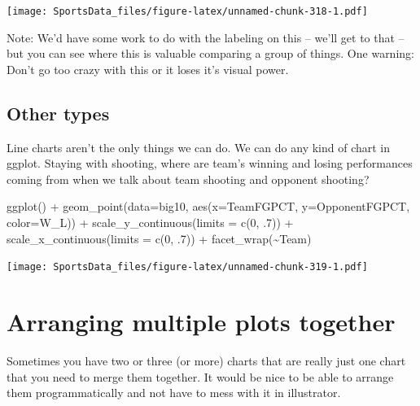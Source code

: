 \documentclass[
]{book}
\newenvironment{Shaded}{\begin{snugshade}}{\end{snugshade}}
\newcommand{\AttributeTok}[1]{\textcolor[rgb]{0.77,0.63,0.00}{#1}}
\newcommand{\DecValTok}[1]{\textcolor[rgb]{0.00,0.00,0.81}{#1}}
\newcommand{\FunctionTok}[1]{\textcolor[rgb]{0.00,0.00,0.00}{#1}}
\newcommand{\NormalTok}[1]{#1}
\newcommand{\SpecialCharTok}[1]{\textcolor[rgb]{0.00,0.00,0.00}{#1}}
\begin{document}
\texttt{[image: SportsData\_files/figure-latex/unnamed-chunk-318-1.pdf]}

Note: We'd have some work to do with the labeling on this -- we'll get to that -- but you can see where this is valuable comparing a group of things. One warning: Don't go too crazy with this or it loses it's visual power.

\hypertarget{other-types}{%
\section{Other types}\label{other-types}}

Line charts aren't the only things we can do. We can do any kind of chart in ggplot. Staying with shooting, where are team's winning and losing performances coming from when we talk about team shooting and opponent shooting?

\begin{Shaded}
\begin{Highlighting}[]
\FunctionTok{ggplot}\NormalTok{() }\SpecialCharTok{+} 
  \FunctionTok{geom\_point}\NormalTok{(}\AttributeTok{data=}\NormalTok{big10, }\FunctionTok{aes}\NormalTok{(}\AttributeTok{x=}\NormalTok{TeamFGPCT, }\AttributeTok{y=}\NormalTok{OpponentFGPCT, }\AttributeTok{color=}\NormalTok{W\_L)) }\SpecialCharTok{+}
  \FunctionTok{scale\_y\_continuous}\NormalTok{(}\AttributeTok{limits =} \FunctionTok{c}\NormalTok{(}\DecValTok{0}\NormalTok{, .}\DecValTok{7}\NormalTok{)) }\SpecialCharTok{+} 
  \FunctionTok{scale\_x\_continuous}\NormalTok{(}\AttributeTok{limits =} \FunctionTok{c}\NormalTok{(}\DecValTok{0}\NormalTok{, .}\DecValTok{7}\NormalTok{)) }\SpecialCharTok{+} 
  \FunctionTok{facet\_wrap}\NormalTok{(}\SpecialCharTok{\textasciitilde{}}\NormalTok{Team)}
\end{Highlighting}
\end{Shaded}

\texttt{[image: SportsData\_files/figure-latex/unnamed-chunk-319-1.pdf]}

\hypertarget{arranging-multiple-plots-together}{%
\chapter{Arranging multiple plots together}\label{arranging-multiple-plots-together}}

Sometimes you have two or three (or more) charts that are really just one chart that you need to merge them together. It would be nice to be able to arrange them programmatically and not have to mess with it in illustrator.
\end{document}
